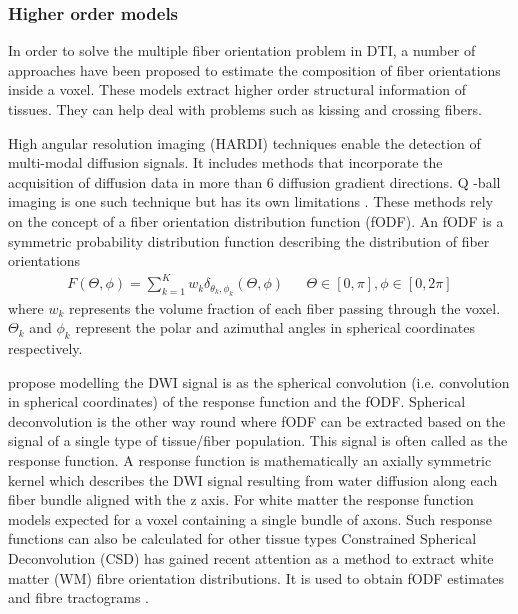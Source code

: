 \documentclass[msthesis.tex]{subfiles}
\begin{document}
\subsubsection{Higher order models}
\label{sec:highermodels}

In order to solve the multiple fiber orientation problem in DTI, a number of approaches have been proposed to estimate the composition of fiber orientations inside a voxel. These models extract higher order structural information of tissues. They can help deal with problems such as kissing and crossing fibers. 

High angular resolution imaging (HARDI) techniques enable the detection of multi-modal diffusion signals. It includes methods that incorporate the acquisition of diffusion data in more than 6 diffusion gradient directions. Q -ball imaging is one such technique but has its own limitations \cite{TOURNIER20041176}. These methods rely on the concept of a fiber orientation distribution function (fODF). An fODF is a symmetric probability distribution function describing the distribution of fiber orientations
\begin{align}
  F(\Theta, \phi) = \sum_{k=1}^{K} w_k \delta_{\theta_k, \phi_k}(\Theta, \phi) &
 & \Theta \in [0, \pi], \phi \in [0,2\pi]
\end{align}
where $w_k$ represents the volume fraction of each fiber passing through the voxel. $\Theta_k$ and $\phi_k$ represent the polar and azimuthal angles in spherical coordinates respectively.

 \cite{tournier2004direct} propose modelling the DWI signal is as the spherical convolution (i.e. convolution in spherical coordinates) of the response function and the fODF. Spherical deconvolution is the other way round where fODF can be extracted based on the signal of a single type of tissue/fiber population. This signal is often called as the response function. A response function is mathematically an axially symmetric kernel which describes the DWI signal resulting from water diffusion along each fiber bundle aligned with the z axis. For white matter the response function models expected for a voxel containing a single bundle of axons. Such response functions can also be calculated for other tissue types
Constrained Spherical Deconvolution (CSD) has gained recent attention as a method to extract white matter (WM) fibre orientation distributions. It is used to obtain fODF estimates and fibre tractograms \cite{JEURISSEN2014411}.
\end{document}
